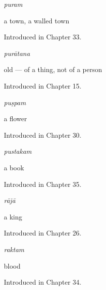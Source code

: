 \noindent\begin{minipage}[t]{\linewidth}
\raggedright
\textbf{}\enspace\emph{puram}\par
\small a town, a walled town\par
\footnotesize Introduced in Chapter 33.
\end{minipage}\par\medskip

\noindent\begin{minipage}[t]{\linewidth}
\raggedright
\textbf{}\enspace\emph{purātana}\par
\small old — of a thing, not of a person\par
\footnotesize Introduced in Chapter 15.
\end{minipage}\par\medskip

\noindent\begin{minipage}[t]{\linewidth}
\raggedright
\textbf{}\enspace\emph{puṣpam}\par
\small a flower\par
\footnotesize Introduced in Chapter 30.
\end{minipage}\par\medskip

\noindent\begin{minipage}[t]{\linewidth}
\raggedright
\textbf{}\enspace\emph{pustakam}\par
\small a book\par
\footnotesize Introduced in Chapter 35.
\end{minipage}\par\medskip

\noindent\begin{minipage}[t]{\linewidth}
\raggedright
\textbf{}\enspace\emph{rājā}\par
\small a king\par
\footnotesize Introduced in Chapter 26.
\end{minipage}\par\medskip

\noindent\begin{minipage}[t]{\linewidth}
\raggedright
\textbf{}\enspace\emph{raktam}\par
\small blood\par
\footnotesize Introduced in Chapter 34.
\end{minipage}\par\medskip

